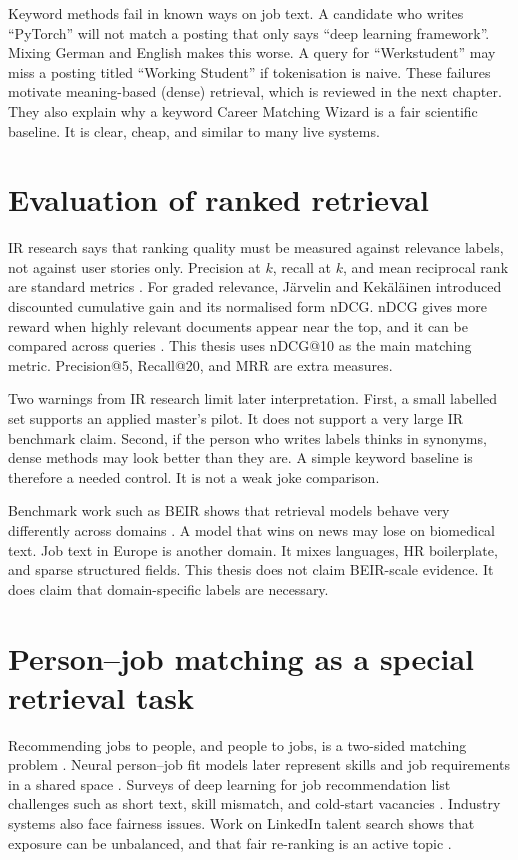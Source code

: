 Keyword methods fail in known ways on job text. A candidate who writes ``PyTorch'' will not match a posting that only says ``deep learning framework''. Mixing German and English makes this worse. A query for ``Werkstudent'' may miss a posting titled ``Working Student'' if tokenisation is naive. These failures motivate meaning-based (dense) retrieval, which is reviewed in the next chapter. They also explain why a keyword Career Matching Wizard is a fair scientific baseline. It is clear, cheap, and similar to many live systems.

\section{Evaluation of ranked retrieval}
\label{sec:ir-eval}

IR research says that ranking quality must be measured against relevance labels, not against user stories only. Precision at $k$, recall at $k$, and mean reciprocal rank are standard metrics . For graded relevance, J\"arvelin and Kek\"al\"ainen introduced discounted cumulative gain and its normalised form nDCG. nDCG gives more reward when highly relevant documents appear near the top, and it can be compared across queries . This thesis uses nDCG@10 as the main matching metric. Precision@5, Recall@20, and MRR are extra measures.

Two warnings from IR research limit later interpretation. First, a small labelled set supports an applied master's pilot. It does not support a very large IR benchmark claim. Second, if the person who writes labels thinks in synonyms, dense methods may look better than they are. A simple keyword baseline is therefore a needed control. It is not a weak joke comparison.

Benchmark work such as BEIR shows that retrieval models behave very differently across domains . A model that wins on news may lose on biomedical text. Job text in Europe is another domain. It mixes languages, HR boilerplate, and sparse structured fields. This thesis does not claim BEIR-scale evidence. It does claim that domain-specific labels are necessary.

\section{Person--job matching as a special retrieval task}
\label{sec:jobmatch}

Recommending jobs to people, and people to jobs, is a two-sided matching problem . Neural person--job fit models later represent skills and job requirements in a shared space . Surveys of deep learning for job recommendation list challenges such as short text, skill mismatch, and cold-start vacancies . Industry systems also face fairness issues. Work on LinkedIn talent search shows that exposure can be unbalanced, and that fair re-ranking is an active topic .

